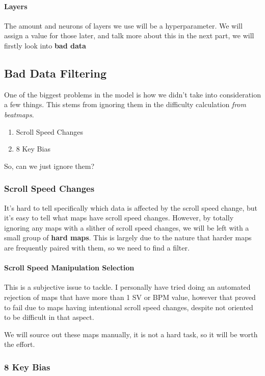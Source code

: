 \paragraph{Layers} The amount and neurons of layers we use will be a hyperparameter. We will assign a value for those later, and talk more about this in the next part, we will firstly look into \textbf{bad data}

\subsection{Bad Data Filtering}

One of the biggest problems in the model is how we didn't take into consideration a few things. This stems from ignoring them in the difficulty calculation \textit{from beatmaps}.

\begin{enumerate}
	\item Scroll Speed Changes
	\item 8 Key Bias
\end{enumerate}

So, can we just ignore them?

\subsubsection{Scroll Speed Changes}

It's hard to tell specifically which data is affected by the scroll speed change, but it's easy to tell what maps have scroll speed changes. However, by totally ignoring any maps with a slither of scroll speed changes, we will be left with a small group of \textbf{hard maps}. This is largely due to the nature that harder maps are frequently paired with them, so we need to find a filter.

\paragraph{Scroll Speed Manipulation Selection}

This is a subjective issue to tackle. I personally have tried doing an automated rejection of maps that have more than 1 SV or BPM value, however that proved to fail due to maps having intentional scroll speed changes, despite not oriented to be difficult in that aspect.

We will source out these maps manually, it is not a hard task, so it will be worth the effort.

\subsubsection{8 Key Bias}

